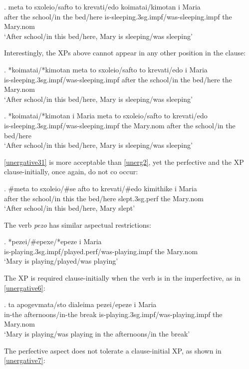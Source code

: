 \documentclass[11pt]{article}
\begin{document}
\exg.
meta to sxoleio/safto to krevati/edo koimatai/kimotan i Maria\\
after the school/in the bed/here is-sleeping.3sg.impf/was-sleeping.impf the Mary.nom\label{unergative3}\\
`After school/in this bed/here, Mary is sleeping/was sleeping'

Interestingly, the XPs above cannot appear in any other position in the clause:

\exg.
*koimatai/*kimotan meta to sxoleio/safto to krevati/edo  i Maria\\
is-sleeping.3sg.impf/was-sleeping.impf after the school/in the bed/here the Mary.nom\label{unergative35}\\
`After school/in this bed/here, Mary is sleeping/was sleeping'

\exg.
*koimatai/*kimotan i Maria meta to sxoleio/safto to krevati/edo\\
is-sleeping.3sg.impf/was-sleeping.impf the Mary.nom after the school/in the bed/here \label{unergative36}\\
`After school/in this bed/here, Mary is sleeping/was sleeping'

\ref{unergative31} is more acceptable than \ref{unerg2}, yet the perfective and the XP clause-initially, once again, do not co occur:

\exg.
\#meta to sxoleio/\#se afto to krevati/\#edo kimithike i Maria\\
after the school/in this the bed/here slept.3sg.perf the Mary.nom\label{unergative31}\\
`After school/in this bed/here, Mary slept'

The verb \textit{pezo} has similar aspectual restrictions:

\exg.
*pezei/\#epexe/*epeze i Maria\\
is-playing.3sg.impf/played.perf/was-playing.impf the Mary.nom\label{unergative5}\\
`Mary is playing/played/was playing'

The XP is required clause-initially when the verb is in the imperfective, as in \ref{unergative6}:

\exg.
ta apogevmata/sto dialeima pezei/epeze i Maria\\
in-the afternoons/in-the break is-playing.3sg.impf/was-playing.impf the Mary.nom\label{unergative6}\\
`Mary is playing/was playing in the afternoons/in the break'

The perfective aspect does not tolerate a clause-initial XP, as shown in \ref{unergative7}:
\end{document}
